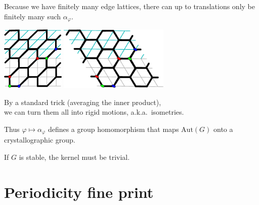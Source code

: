 \documentclass{beamer}
\begin{document}
\begin{frame}
  \begin{center}
    Because we have finitely many edge lattices, there can up to translations
    only be finitely many such $\alpha_\varphi$.

    \includegraphics[height=1.2in]{affine}
    \qquad
    \includegraphics[height=1.2in]{affine-squashed}

    By a standard trick (averaging the inner product),\\
    we can turn them all into rigid motions, a.k.a.\ isometries.

    Thus $\varphi \mapsto \alpha_\varphi$ defines a group homomorphism that
    maps $\mathrm{Aut}(G)$ onto a crystallographic group.

    If $G$ is stable, the kernel must be trivial.
  \end{center}
\end{frame}


\section{Periodicity fine print}
\end{document}

